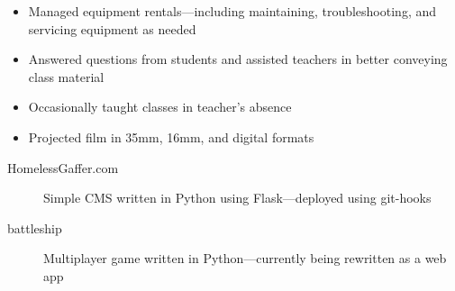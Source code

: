 \documentclass[letterpaper]{article}        %
\begin{document}
  \begin{itemize}
  
  \item Managed equipment rentals---including maintaining, troubleshooting, and servicing equipment as needed
  
  \item Answered questions from students and assisted teachers in better conveying class material
  
  \item Occasionally taught classes in teacher's absence
  
  \item Projected film in 35mm, 16mm, and digital formats
  
  \end{itemize}
  
  



  \begin{description}
    \item[HomelessGaffer.com] Simple CMS written in Python using Flask---deployed using git-hooks
    \item[battleship] Multiplayer game written in Python---currently being rewritten as a web app
    
  \end{description}




\end{document}
